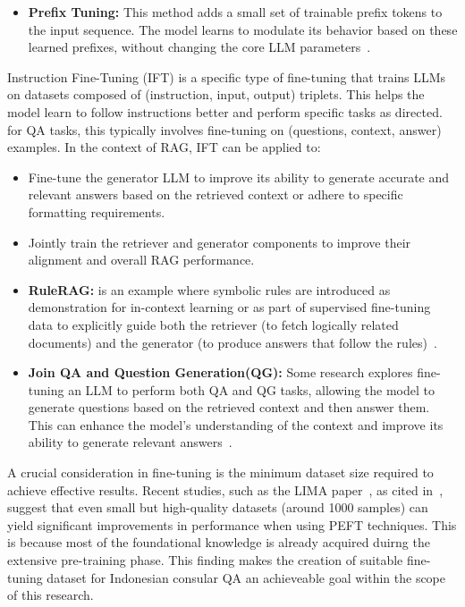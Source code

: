 \documentclass[12pt]{report}
\begin{document}
\begin{itemize}
\begin{itemize}
      \item \textbf{Prefix Tuning:} This method adds a small set of trainable prefix tokens to the input sequence. The model learns to modulate its behavior based on these learned prefixes, without changing the core LLM parameters~\cite{li-liang-2021-prefix}.
    \end{itemize}
\end{itemize}

Instruction Fine-Tuning (IFT) is a specific type of fine-tuning that trains LLMs on datasets composed of (instruction, input, output) triplets. This helps the model learn to follow instructions better and perform specific tasks as directed. for QA tasks, this typically involves fine-tuning on (questions, context, answer) examples. In the context of RAG, IFT can be applied to:

\begin{itemize}
    \item Fine-tune the generator LLM to improve its ability to generate accurate and relevant answers based on the retrieved context or adhere to specific formatting requirements.
    \item Jointly train the retriever and generator components to improve their alignment and overall RAG performance.
    \item \textbf{RuleRAG:} is an example where symbolic rules are introduced as demonstration for in-context learning or as part of supervised fine-tuning data to explicitly guide both the retriever (to fetch logically related documents) and the generator (to produce answers that follow the rules)~\cite{chen2025ruleragruleguidedretrievalaugmentedgeneration}.
    \item \textbf{Join QA and Question Generation(QG):} Some research explores fine-tuning an LLM to perform both QA and QG tasks, allowing the model to generate questions based on the retrieved context and then answer them. This can enhance the model's understanding of the context and improve its ability to generate relevant answers~\cite{xu2025simragselfimprovingretrievalaugmentedgeneration}.
\end{itemize}

A crucial consideration in fine-tuning is the minimum dataset size required to achieve effective results. Recent studies, such as the LIMA paper~\cite{NEURIPS2023_ac662d74}, as cited in~\cite{ratnakar2025qapairsassessingparameterefficient}, suggest that even small but high-quality datasets (around 1000 samples) can yield significant improvements in performance when using PEFT techniques.
This is because most of the foundational knowledge is already acquired duirng the extensive pre-training phase. This finding makes the creation of suitable fine-tuning dataset for Indonesian consular QA an achieveable goal within the scope of this research.
\end{document}

